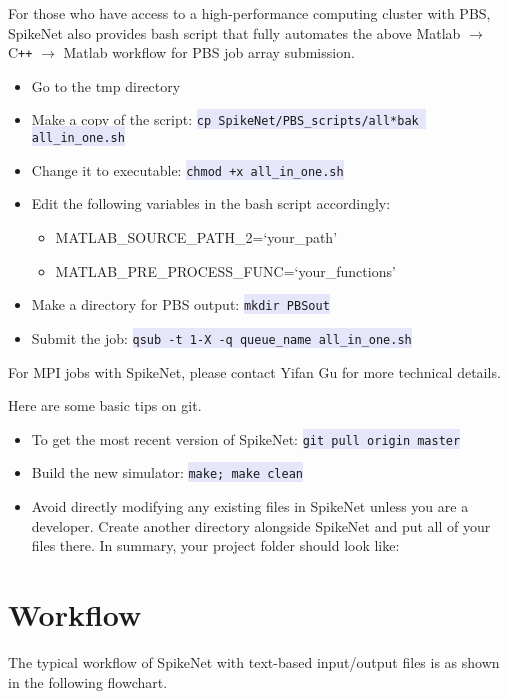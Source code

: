 \documentclass{article}
\newcommand{\mylstinline}[1] {\colorbox{Lavender}{\lstinline[basicstyle=\ttfamily\footnotesize\color{Black}]|#1|} }
\begin{document}
For those who have access to a high-performance computing cluster with PBS, SpikeNet also provides bash script that fully automates the above Matlab $\rightarrow$  C\texttt{++}  $\rightarrow$ Matlab workflow for PBS job array submission. 
\begin{itemize}
\item Go to the tmp directory
\item Make a copy of the script: \mylstinline{cp SpikeNet/PBS_scripts/all*bak all_in_one.sh}
\item Change it to executable: \mylstinline{chmod +x all_in_one.sh}
\item Edit the following variables in the bash script accordingly: 
\begin{itemize}
\item {\footnotesize MATLAB\_SOURCE\_PATH\_2=`your\_path'}
\item {\footnotesize MATLAB\_PRE\_PROCESS\_FUNC=`your\_functions'}
\end{itemize}
\item Make a directory for PBS output: \mylstinline{mkdir PBSout}
\item Submit the job: \mylstinline{qsub -t 1-X -q queue_name all_in_one.sh}
\end{itemize}
For MPI jobs with SpikeNet, please contact Yifan Gu for more technical details.

Here are some basic tips on git.
\begin{itemize}
\item To get the most recent version of SpikeNet: \mylstinline{git pull origin master}
\item Build the new simulator: \mylstinline{make; make clean}
\item Avoid directly modifying any existing files in SpikeNet unless you are a developer. Create another directory alongside SpikeNet and put all of your files there. In summary, your project folder should look like:
\end{itemize}
\hfill\begin{minipage}{\dimexpr\textwidth-1cm}
\xdef\tpd{\the\prevdepth}
\end{minipage}

\section{Workflow}
The typical workflow of SpikeNet with text-based input/output files is as shown in the following flowchart.
\vskip 0.5cm
\end{document}
